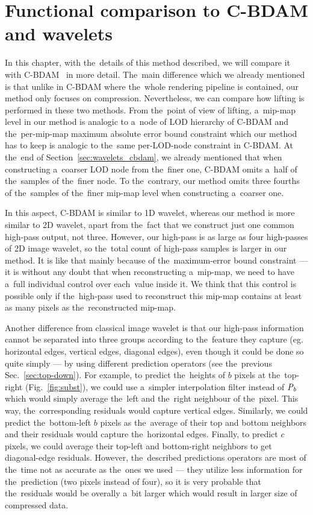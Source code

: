 \chapter{Functional comparison to C-BDAM and wavelets}\label{chap:cbdam_comp}

In this chapter, with the~details of this method described, we will compare it with C-BDAM~\cite{cbdam} in more detail. The~main difference which we already mentioned is that unlike in C-BDAM where the~whole rendering pipeline is contained, our method only focuses on compression. Nevertheless, we can compare how lifting is performed in these two methods. From the~point of view of lifting, a~mip-map level in our method is analogic to a~node of LOD hierarchy of C-BDAM and the~per-mip-map maximum absolute error bound constraint which our method has to keep is analogic to the~same per-LOD-node constraint in C-BDAM. At the~end of Section~\ref{sec:wavelets_cbdam}, we already mentioned that when constructing a~coarser LOD node from the~finer one, C-BDAM omits a~half of the~samples of the~finer node. To the~contrary, our method omits three fourths of the~samples of the~finer mip-map level when constructing a~coarser one. 

In this aspect, C-BDAM is similar to 1D wavelet, whereas our method is more similar to 2D wavelet, apart from the~fact that we construct just one common high-pass output, not three. However, our high-pass is as large as four high-passes of 2D image wavelet, so the~total count of high-pass samples is larger in our method. It is like that mainly because of the~maximum-error bound constraint --- it is without any doubt that when reconstructing a~mip-map, we need to have a~full individual control over each~value inside it. We think that this control is possible only if the~high-pass used to reconstruct this mip-map contains at least as many pixels as the~reconstructed mip-map.

Another difference from classical image wavelet is that our high-pass information cannot be separated into three groups according to the~feature they capture (eg. horizontal edges, vertical edges, diagonal edges), even though it could be done so quite simply --- by using different prediction operators (see the~previous Sec.~\ref{sec:top-down}). For example, to predict the~heights of $b$ pixels at the~top-right (Fig.~\ref{fig:subst}), we could use a~simpler interpolation filter instead of $\mathit{P_{b}}$ which would simply average the~left and the~right neighbour of the~pixel. This way, the~corresponding residuals would capture vertical edges. Similarly, we could predict the~bottom-left $b$ pixels as the~average of their top and bottom neighbors and their residuals would capture the~horizontal edges. Finally, to predict $c$ pixels, we could average their top-left and bottom-right neighbors to get diagonal-edge residuals. However, the~described predictions operators are most of the~time not as accurate as the~ones we used --- they utilize less information for the~prediction (two pixels instead of four), so it is very probable that the~residuals would be overally a~bit larger which would result in larger size of compressed data.

